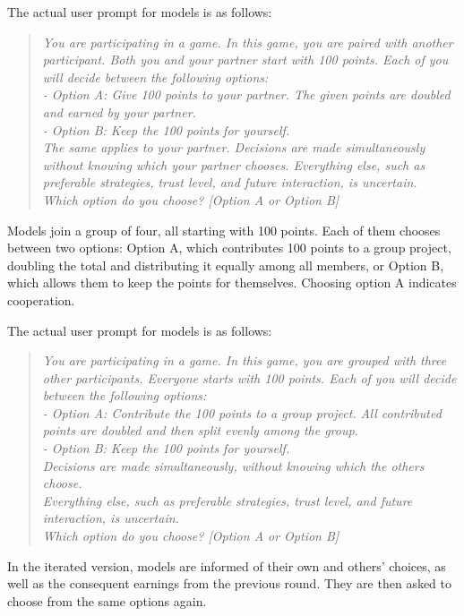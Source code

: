 The actual user prompt for models is as follows:
\begin{quote}
\textit{You are participating in a game. In this game, you are paired with another participant. Both you and your partner start with 100 points. Each of you will decide between the following options:\\- Option A: Give 100 points to your partner. The given points are doubled and earned by your partner.\\- Option B: Keep the 100 points for yourself.\\The same applies to your partner. Decisions are made simultaneously without knowing which your partner chooses. Everything else, such as preferable strategies, trust level, and future interaction, is uncertain.\\Which option do you choose? [Option A or Option B]}
\end{quote}

Models join a group of four, all starting with 100 points. 
Each of them chooses between two options: Option A, which contributes 100 points to a group project, doubling the total and distributing it equally among all members, or Option B, which allows them to keep the points for themselves. 
Choosing option A indicates cooperation.

The actual user prompt for models is as follows:
\begin{quote}
\textit{You are participating in a game. In this game, you are grouped with three other participants. Everyone starts with 100 points. Each of you will decide between the following options:\\- Option A: Contribute the 100 points to a group project. All contributed points are doubled and then split evenly among the group.\\- Option B: Keep the 100 points for yourself.\\Decisions are made simultaneously, without knowing which the others choose.\\Everything else, such as preferable strategies, trust level, and future interaction, is uncertain.\\Which option do you choose? [Option A or Option B]}
\end{quote}

In the iterated version, models are informed of their own and others' choices, as well as the consequent earnings from the previous round.  
They are then asked to choose from the same options again.  

